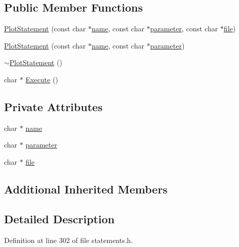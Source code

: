 \subsection*{Public Member Functions}
\begin{DoxyCompactItemize}
\item 
\hyperlink{classPlotStatement_a47efbe7353578971d93bc9843ffbe2e1}{Plot\+Statement} (const char $\ast$\hyperlink{classPlotStatement_ab057af7c22b9fd7ec06e530174dda200}{name}, const char $\ast$\hyperlink{classPlotStatement_aa0356a6cdd1362b3efb6eb732249dcf2}{parameter}, const char $\ast$\hyperlink{classPlotStatement_af5c41edc8fcd55bbf986e02fbf176885}{file})
\item 
\hyperlink{classPlotStatement_ab627e3becfbdd9d11f13b544c7dfa6c3}{Plot\+Statement} (const char $\ast$\hyperlink{classPlotStatement_ab057af7c22b9fd7ec06e530174dda200}{name}, const char $\ast$\hyperlink{classPlotStatement_aa0356a6cdd1362b3efb6eb732249dcf2}{parameter})
\item 
\hyperlink{classPlotStatement_aa2d08e5d7d33fe68e0a2512fc4457295}{$\sim$\+Plot\+Statement} ()
\item 
char $\ast$ \hyperlink{classPlotStatement_a653ff64c2c918b3209be426f7c243459}{Execute} ()
\end{DoxyCompactItemize}
\subsection*{Private Attributes}
\begin{DoxyCompactItemize}
\item 
char $\ast$ \hyperlink{classPlotStatement_ab057af7c22b9fd7ec06e530174dda200}{name}
\item 
char $\ast$ \hyperlink{classPlotStatement_aa0356a6cdd1362b3efb6eb732249dcf2}{parameter}
\item 
char $\ast$ \hyperlink{classPlotStatement_af5c41edc8fcd55bbf986e02fbf176885}{file}
\end{DoxyCompactItemize}
\subsection*{Additional Inherited Members}


\subsection{Detailed Description}


Definition at line 302 of file statements.\+h.



